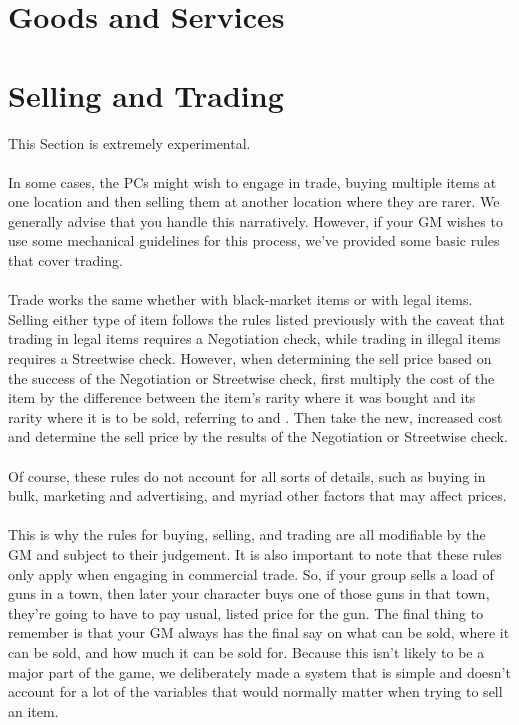 \FloatBarrier
\section{Goods and Services}

\hrulefill

\hrulefill


\section{Selling and Trading}\label{chap:sec:trading}

This Section is extremely experimental.\\
\\
In some cases, the PCs might wish to engage in trade, buying multiple items at one
location and then selling them at another location where they are rarer. We generally
advise that you handle this narratively. However, if your GM wishes to use some
mechanical guidelines for this process, we’ve provided some basic rules that cover trading.\\
\\
Trade works the same whether with black-market items or with legal items. Selling
either type of item follows the rules listed previously with the caveat that trading
in legal items requires a Negotiation check, while trading in illegal items requires a
Streetwise check. However, when determining the sell price based on the success of the
Negotiation or Streetwise check, first multiply the cost of the item by the difference
between the item's rarity where it was bought and its rarity where it is to be sold,
referring to  and .
Then take the new, increased cost and determine the sell price by the results of the
Negotiation or Streetwise check.\\
\\
Of course, these rules do not account for all sorts of details, such as buying in bulk,
marketing and advertising, and myriad other factors that may affect prices.\\
\\
This is why the rules for buying, selling, and trading are all modifiable by the GM and
subject to their judgement. It is also important to note that these rules only apply when
engaging in commercial trade. So, if your group sells a load of guns in a town, then
later your character buys one of those guns in that town, they’re going to have to pay
usual, listed price for the gun. The final thing to remember is that your GM always has the
final say on what can be sold, where it can be sold, and how much it can be sold for.
Because this isn't likely to be a major part of the game, we deliberately made a system
that is simple and doesn't account for a lot of the variables that would normally matter
when trying to sell an item.

